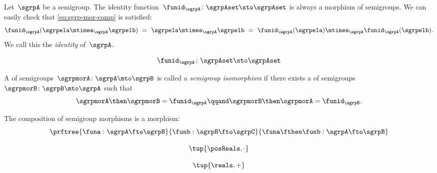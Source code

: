 \begin{ctdefinition}
  \label{def:identity-sgrp-mor}
  Let~$\sgrpA$ be a semigroup.
  The identity function~$\funid_\sgrpA\colon \sgrpAset \sto \sgrpAset$ is always a morphism of semigroups.
  We can easily check that \cref{eq:sgrp-mor-comp} is satisfied:
  \begin{equation}\label{eq:identity-sgrp-mor-proof}
    \funid_\sgrpA (\sgrpela \mtimes_{\sgrpA} \sgrpelb) \ = \  \sgrpela \mtimes_{\sgrpA} \sgrpelb
     \ = \
    \funid_\sgrpA (\sgrpela )\mtimes_{\sgrpA}\funid_\sgrpA(\sgrpelb).
  \end{equation}
%
  We call this the \emph{identity \whomo} of~$\sgrpA$.
\end{ctdefinition}
\begin{forslides}
\begin{equation}\label{eq:identity-sgrp}
\funid_\sgrpA\colon \sgrpAset \sto \sgrpAset
\end{equation}
\end{forslides}



\begin{ctdefinition}
  \label{def:semigroup-iso}
  A \whomo of semigroups~$\sgrpmorA\colon \sgrpA \mto \sgrpB$ is called a \emph{semigroup isomorphism} if there exists a \whomo of semigroups~$\sgrpmorB\colon \sgrpB \mto \sgrpA$ such that
  \begin{equation}
    \label{eq:sgrp-iso-cond}
    \sgrpmorA \then \sgrpmorB = \funid_\sgrpA  \qqand \sgrpmorB \then \sgrpmorA = \funid_\sgrpB.
  \end{equation}
\end{ctdefinition}

\begin{lemma}\label{lem:semigroup-morphisms-compose}
The composition of semigroup morphisms is a morphism:
\begin{equation}\label{eq:sgrp-mor-compo}
\prftree{\funa  : \sgrpA \fto \sgrpB}{\funb : \sgrpB \fto \sgrpC}{
\funa \fthen \funb  : \sgrpA \fto \sgrpB}
\end{equation}
\end{lemma}

\begin{forslides}
\begin{equation}\label{eq:sgrp-posreals-mult}
\tup{\posReals, \cdot}
\end{equation}

\begin{equation}\label{eq:sgrp-reals-plus}
\tup{\reals, +}
\end{equation}
\end{forslides}

